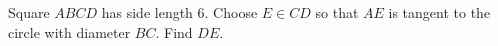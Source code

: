 Square $ABCD$ has side length $6$. Choose $E\in CD$ so that $AE$ is tangent to the circle with diameter $BC$. Find $DE$.
